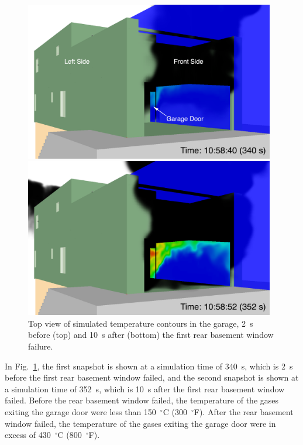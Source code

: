 \documentclass[12pt,oneside]{book}
\begin{document}
\begin{figure}[!ht]
\includegraphics[width=4.3in]{../Figures/SMV_Garage_Temp_340_s}


\includegraphics[width=4.3in]{../Figures/SMV_Garage_Temp_352_s}


\caption[Simulated temperature contours in the garage after basement window failure.]
{Top view of simulated temperature contours in the garage, 2~s before (top) and 10~s after (bottom) the first rear basement window failure.}
\label{fig:smv_flow_path_garage}
\end{figure}


\clearpage


In Fig.~\ref{fig:smv_flow_path_garage}, the first snapshot is shown at a simulation time of 340~s, which is 2~s before the first rear basement window failed, and the second snapshot is shown at a simulation time of 352~s, which is 10~s after the first rear basement window failed. Before the rear basement window failed, the temperature of the gases exiting the garage door were less than 150~$^{\circ}$C (300~$^{\circ}$F). After the rear basement window failed, the temperature of the gases exiting the garage door were in excess of 430~$^{\circ}$C (800~$^{\circ}$F).
\end{document}
